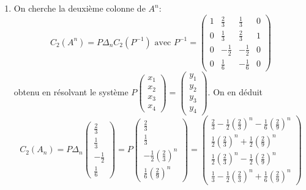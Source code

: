 \begin{enumerate}
\begin{enumerate}
  \item On cherche la deuxième colonne de $A^n$:
\begin{displaymath}
  C_2(A^n) = P \Delta_n C_2(P^{-1}) \text{ avec } P^{-1}=
\begin{pmatrix}
1 & \frac{2}{3} & \frac{1}{3}  & 0 \\
0 & \frac{1}{3} & \frac{2}{3} & 1  \\
0 & -\frac{1}{2} & -\frac{1}{2} & 0 \\
0 & \frac{1}{6} & -\frac{1}{6}  & 0
\end{pmatrix}
\end{displaymath}
obtenu en résolvant le système $P\begin{pmatrix}x_1\\x_2\\x_3\\x_4\end{pmatrix}= \begin{pmatrix}y_1\\y_2\\y_3\\y_4\end{pmatrix}$. On en déduit
\renewcommand{\arraystretch}{1.5}
\begin{displaymath}
C_2(A_n) = P\Delta_n  \begin{pmatrix} \frac{2}{3}\\ \frac{1}{3} \\ -\frac{1}{2} \\ \frac{1}{6} \end{pmatrix}
= P
\begin{pmatrix} \frac{2}{3}\\ \frac{1}{3} \\ -\frac{1}{2}(\frac{2}{3})^{n} \\ \frac{1}{6}(\frac{2}{9})^{n} \end{pmatrix}
=\begin{pmatrix}
\frac{2}{3}-\frac{1}{2}(\frac{2}{3})^{n} - \frac{1}{6}(\frac{2}{9})^{n}\\
\frac{1}{2}(\frac{2}{3})^{n} + \frac{1}{2}(\frac{2}{9})^{n} \\
\frac{1}{2}(\frac{2}{3})^{n} - \frac{1}{2}(\frac{2}{9})^{n}\\
\frac{1}{3} -\frac{1}{2}(\frac{2}{3})^{n} + \frac{1}{6}(\frac{2}{9})^{n}
\end{pmatrix}
\end{displaymath}


\end{enumerate}
\end{enumerate}
